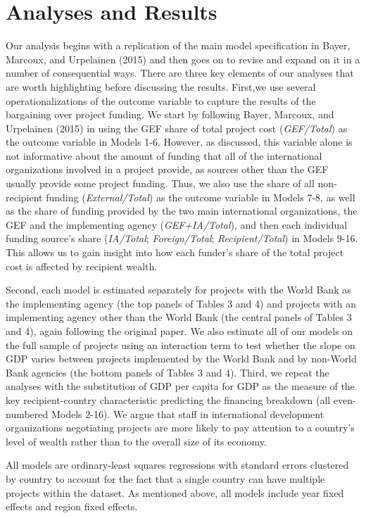 \documentclass{article}
\begin{document}
\section{Analyses and Results}
Our analysis begins with a replication of the main model specification in Bayer, Marcoux, and Urpelainen (2015) and then goes on to revise and expand on it in a number of consequential ways.  There are three key elements of our analyses that are worth highlighting before discussing the results.  First,we use several operationalizations of the outcome variable to capture the results of the bargaining over project funding.  We start by following Bayer, Marcoux, and Urpelainen (2015) in using the GEF share of total project cost (\textit{GEF/Total}) as the outcome variable in Models 1-6.  However, as discussed, this variable alone is not informative about the amount of funding that all of the international organizations involved in a project provide, as sources other than the GEF usually provide some project funding.  Thus, we also use the share of all non-recipient funding (\textit{External/Total}) as the outcome variable in Models 7-8, as well as the share of funding provided by the two main international organizations, the GEF and the implementing agency (\textit{GEF+IA/Total}), and then each individual funding source’s share (\textit{IA/Total}; \textit{Foreign/Total}; \textit{Recipient/Total}) in Models 9-16.  This allows us to gain insight into how each funder’s share of the total project cost is affected by recipient wealth. 

Second, each model is estimated separately for projects with the World Bank as the implementing agency (the top panels of Tables 3 and 4) and projects with an implementing agency other than the World Bank (the central panels of Tables 3 and 4), again following the original paper.  We also estimate all of our models on the full sample of projects using an interaction term to test whether the slope on GDP varies between projects implemented by the World Bank and by non-World Bank agencies (the bottom panels of Tables 3 and 4).  Third, we repeat the analyses with the substitution of GDP per capita for GDP as the measure of the key recipient-country characteristic predicting the financing breakdown (all even-numbered Models 2-16).  We argue that staff in international development organizations negotiating projects are more likely to pay attention to a country’s level of wealth rather than to the overall size of its economy. 

All models are ordinary-least squares regressions with standard errors clustered by country to account for the fact that a single country can have multiple projects within the dataset.  As mentioned above, all models include year fixed effects and region fixed effects.
\end{document}
